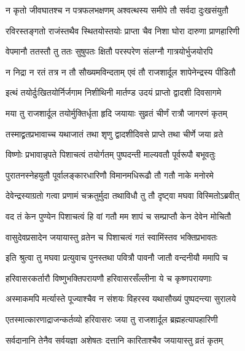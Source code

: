 \twolineshloka
{न कृतो जीवघातश्च न पत्रफलभक्षणम्}
{अश्वत्थस्य समीपे तौ सर्वदा दुःखसंयुतौ}%

\twolineshloka
{रविरस्तङ्गतो राजंस्तथैव स्थितयोस्तयोः}
{प्राप्ता चैव निशा घोरा दारुणा प्राणहारिणी}%

\twolineshloka
{वेपमानौ ततस्तौ तु ततः सुषुपतः क्षितौ}
{परस्परेण संलग्नौ गात्रयोर्भुजयोरपि}%

\twolineshloka
{न निद्रा न रतं तत्र न तौ सौख्यमविन्दताम्}
{एवं तौ राजशार्दूल शापेनेन्द्रस्य पीडितौ}%

\twolineshloka
{इत्थं तयोर्दुःखितयोर्निर्जगाम निशीथिनी}
{मार्तण्ड उदयं प्राप्तो द्वादशी दिवसागमे}%

\twolineshloka
{मया तु राजशार्दूल तयोर्मुक्तिर्धृता हृदि}
{जयायाः सुव्रतं चीर्णं रात्रौ जागरणं कृतम्}%

\twolineshloka
{तस्माद्व्रतप्रभावाच्च यथाजातं तथा शृणु}
{द्वादशीदिवसे प्राप्ते तथा चीर्णे जया व्रते}%

\twolineshloka
{विष्णोः प्रभावान्नृपते पिशाचत्वं तयोर्गतम्}
{पुष्पदन्ती माल्यवतौ पूर्वरूपौ बभूवतुः}%

\twolineshloka
{पुरातनस्नेहयुतौ  पूर्वालङ्कारधारिणौ}
{विमानमधिरूढौ तौ गतौ नाके मनोरमे}%

\twolineshloka
{देवेन्द्रस्याग्रतो गत्वा प्रणामं चक्रतुर्मुदा}
{तथाविधौ तु तौ दृष्ट्वा मघवा विस्मितोऽब्रवीत्}%


\twolineshloka
{वद तं केन पुण्येन पिशाचत्वं हि वां गतौ}
{मम शापं च सम्प्राप्तौ केन देवेन मोचितौ}%


\twolineshloka
{वासुदेवप्रसादेन जयायास्तु व्रतेन च}
{पिशाचत्वं गतं स्वामिंस्तव भक्तिप्रभावतः}%

\twolineshloka
{इति श्रुत्वा तु मघवा प्रत्युवाच पुनस्तथा}
{पवित्रौ पावनौ जातौ वन्दनीयौ ममापि च}%

\twolineshloka
{हरिवासरकर्तारौ विष्णुभक्तिपरायणौ}
{हरिवासरसँल्लीना ये च कृष्णपरायणाः}%

\twolineshloka
{अस्माकमपि मर्त्यास्ते पूज्याश्चैव न संशयः}
{विहरस्व यथासौख्यं पुष्पदन्त्या सुरालये}%


\twolineshloka
{एतस्मात्कारणाद्राजन्कर्तव्यो हरिवासरः}
{जया तु राजशार्दूल ब्रह्महत्यापहारिणी}%

\twolineshloka
{सर्वदानानि तेनैव सर्वयज्ञा अशेषतः}
{दत्तानि कारिताश्चैव जयायास्तु व्रतं कृतम्}%

